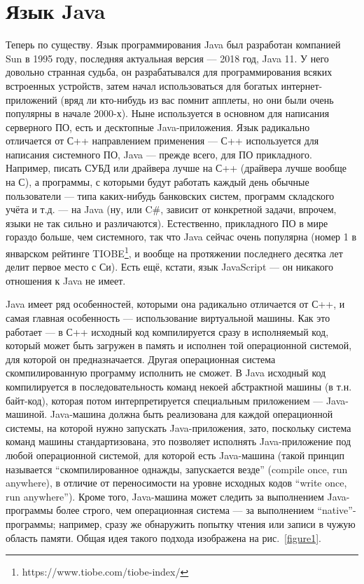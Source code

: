 \documentclass[a5paper]{article}
\begin{document}
\section{Язык Java}

Теперь по существу. Язык программирования Java был разработан компанией Sun в 1995 году, последняя актуальная версия --- 2018 год, Java 11. У него довольно странная судьба, он разрабатывался для программирования всяких встроенных устройств, затем начал использоваться для богатых интернет-приложений (вряд ли кто-нибудь из вас помнит апплеты, но они были очень популярны в начале 2000-х). Ныне используется в основном для написания серверного ПО, есть и десктопные Java-приложения. Язык радикально отличается от С++ направлением применения --- С++ используется для написания системного ПО, Java --- прежде всего, для ПО прикладного. Например, писать СУБД или драйвера лучше на С++ (драйвера лучше вообще на С), а программы, с которыми будут работать каждый день обычные пользователи --- типа каких-нибудь банковских систем, программ складского учёта и т.д. --- на Java (ну, или C\#, зависит от конкретной задачи, впрочем, языки не так сильно и различаются). Естественно, прикладного ПО в мире гораздо больше, чем системного, так что Java сейчас очень популярна (номер 1 в январском рейтинге TIOBE\footnote{https://www.tiobe.com/tiobe-index/}, и вообще на протяжении последнего десятка лет делит первое место с Си). Есть ещё, кстати, язык JavaScript --- он никакого отношения к Java не имеет.

Java имеет ряд особенностей, которыми она радикально отличается от С++, и самая главная особенность --- использование виртуальной машины. Как это работает --- в С++ исходный код компилируется сразу в исполняемый код, который может быть загружен в память и исполнен той операционной системой, для которой он предназначается. Другая операционная система скомпилированную программу исполнить не сможет. В Java исходный код компилируется в последовательность команд некоей абстрактной машины (в т.н. байт-код), которая потом интерпретируется специальным приложением --- Java-машиной. Java-машина должна быть реализована для каждой операционной системы, на которой нужно запускать Java-приложения, зато, поскольку система команд машины стандартизована, это позволяет исполнять Java-приложение под любой операционной системой, для которой есть Java-машина (такой принцип называется ``скомпилированное однажды, запускается везде'' (compile once, run anywhere), в отличие от переносимости на уровне исходных кодов ``write once, run anywhere''). Кроме того, Java-машина может следить за выполнением Java-программы более строго, чем операционная система --- за выполнением ``native''-программы; например, сразу же обнаружить попытку чтения или записи в чужую область памяти. Общая идея такого подхода изображена на рис.~\ref{figure1}.
\end{document}

